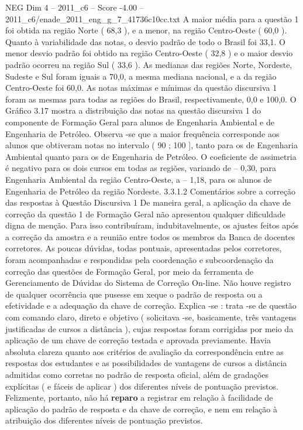 \begin{textsample}{NEG Dim 4 – 2011\_c6 – Score -4.00 – 2011\_c6/enade\_2011\_eng\_g\_7\_41736c10cc.txt}
A maior média para a questão 1 foi obtida na região Norte ( 68,3 ), e a menor, na região Centro-Oeste ( 60,0 ).
Quanto à variabilidade das notas, o desvio padrão de todo o Brasil foi 33,1.
O menor desvio padrão foi obtido na região Centro-Oeste ( 32,8 ) e o maior desvio padrão ocorreu na região Sul ( 33,6 ).
As medianas das regiões Norte, Nordeste, Sudeste e Sul foram iguais a 70,0, a mesma mediana nacional, e a da região Centro-Oeste foi 60,0.
As notas máximas e mínimas da questão discursiva 1 foram as mesmas para todas as regiões do Brasil, respectivamente, 0,0 e 100,0.
O Gráfico 3.17 mostra a distribuição das notas na questão discursiva 1 do componente de Formação Geral para alunos de Engenharia Ambiental e de Engenharia de Petróleo.
Observa -se que a maior frequência corresponde aos alunos que obtiveram notas no intervalo ( 90 ; 100 ], tanto para os de Engenharia Ambiental quanto para os de Engenharia de Petróleo.
O coeficiente de assimetria é negativo para os dois cursos em todas as regiões, variando de – 0,30, para Engenharia Ambiental da região Centro-Oeste, a – 1,18, para os alunos de Engenharia de Petróleo da região Nordeste. 3.3.1.2 Comentários sobre a correção das respostas à Questão Discursiva 1 De maneira geral, a aplicação da chave de correção da questão 1 de Formação Geral não apresentou qualquer dificuldade digna de menção.
Para isso contribuíram, indubitavelmente, os ajustes feitos após a correção da amostra e a reunião entre todos os membros da Banca de docentes corretores.
As poucas dúvidas, todas pontuais, apresentadas pelos corretores, foram acompanhadas e respondidas pela coordenação e subcoordenação da correção das questões de Formação Geral, por meio da ferramenta de Gerenciamento de Dúvidas do Sistema de Correção On-line.
Não houve registro de qualquer ocorrência que pusesse em xeque o padrão de resposta ou a efetividade e a adequação da chave de correção.
Explica -se : trata -se de questão com comando claro, direto e objetivo ( solicitava -se, basicamente, três vantagens justificadas de cursos a distância ), cujas respostas foram corrigidas por meio da aplicação de um chave de correção testada e aprovada previamente.
Havia absoluta clareza quanto aos critérios de avaliação da correspondência entre as respostas dos estudantes e as possibilidades de vantagens de cursos a distância admitidas como corretas no padrão de resposta oficial, além de gradações explícitas ( e fáceis de aplicar ) dos diferentes níveis de pontuação previstos.
Felizmente, portanto, não há \textbf{reparo} a registrar em relação à facilidade de aplicação do padrão de resposta e da chave de correção, e nem em relação à atribuição dos diferentes níveis de pontuação previstos.

\end{textsample}
